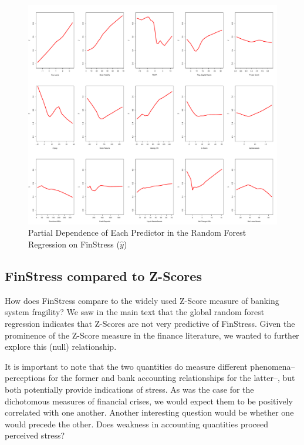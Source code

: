 \documentclass[]{article}
\begin{document}
\begin{landscape}
\begin{figure}
    \caption{Partial Dependence of Each Predictor in the Random Forest Regression on FinStress ($\hat{y}$)}
    \label{rf_partial_depend}
    \begin{center}
        \includegraphics[scale=0.42]{figures/rf_partial_dependence.pdf}
    \end{center}

\end{figure}
\end{landscape}


\subsection*{FinStress compared to Z-Scores}

How does FinStress compare to the widely used Z-Score measure of banking system fragility? We saw in the main text that the global random forest regression indicates that Z-Scores are not very predictive of FinStress. Given the prominence of the Z-Score measure in the finance literature, we wanted to further explore this (null) relationship.

It is important to note that the two quantities do measure different phenomena--perceptions for the former and bank accounting relationships for the latter--, but both potentially  provide indications of stress. As was the case for the dichotomous measures of financial crises, we would expect them to be positively correlated with one another. Another interesting question would be whether one would precede the other. Does weakness in accounting quantities proceed perceived stress?
\end{document}
